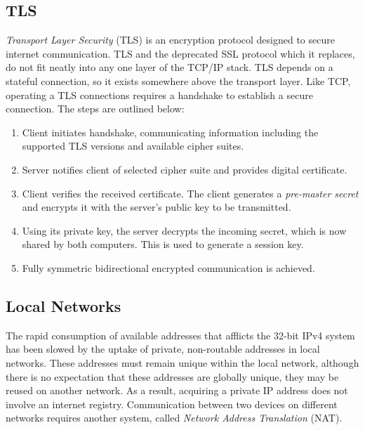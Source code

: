 \documentclass[10pt]{article}
\begin{document}
\subsection{TLS}
\label{sec:orgedcdcea}

\emph{Transport Layer Security} (TLS) is an encryption protocol designed to secure internet communication. TLS and the deprecated SSL protocol which it replaces, do not fit neatly into any one layer of the TCP/IP stack. TLS depends on a stateful connection, so it exists somewhere above the transport layer. Like TCP, operating a TLS connections requires a handshake to establish a secure connection. The steps are outlined below:

\begin{enumerate}
\item Client initiates handshake, communicating information including the supported TLS versions and available cipher suites.

\item Server notifies client of selected cipher suite and provides digital certificate.

\item Client verifies the received certificate. The client generates a \emph{pre-master secret} and encrypts it with the server's public key to be transmitted.

\item Using its private key, the server decrypts the incoming secret, which is now shared by both computers. This is used to generate a session key.

\item Fully symmetric bidirectional encrypted communication is achieved.
\end{enumerate}

\subsection{Local Networks}
\label{sec:orgb43f7bd}

The rapid consumption of available addresses that afflicts the 32-bit IPv4 system has been slowed by the uptake of private, non-routable addresses in local networks. These addresses must remain unique within the local network, although there is no expectation that these addresses are globally unique, they may be reused on another network. As a result, acquiring a private IP address does not involve an internet registry. Communication between two devices on different networks requires another system, called \emph{Network Address Translation} (NAT).
\end{document}
